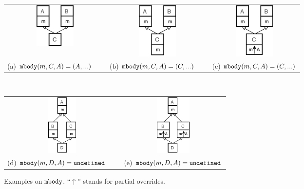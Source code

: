 \begin{figure}[t]
    \centering
    \vspace{-1ex}
    \begin{tabular}{ccc}
        \includegraphics[width=2cm]{pics/p1.pdf}\hspace{4pt} &
        \includegraphics[width=2cm]{pics/p2.pdf}\hspace{4pt} &
        \includegraphics[width=2cm]{pics/p3.pdf}\hspace{4pt} \\
        (a) $\texttt{mbody}(m,C,A) = (A,...)$\ \ \  & (b) $\texttt{mbody}(m,C,A) = (C,...)$\ \ \  & (c) $\texttt{mbody}(m,C,A) = (C,...)$
    \end{tabular} \\
   \begin{tabular}{cc}
    \includegraphics[height=3cm]{pics/p4.pdf}\hspace{4pt} &
    \includegraphics[height=3cm]{pics/p5.pdf}\hspace{4pt} \\ 
    (d) $\texttt{mbody}(m,D,A) = \texttt{undefined}$\ \ \  & (e) $\texttt{mbody}(m,D,A) = \texttt{undefined}$
   \end{tabular}
    \caption{Examples on $\texttt{mbody}$. ``$\uparrow$'' stands for partial overrides.}\label{fig:examplesmbody}
\end{figure}

